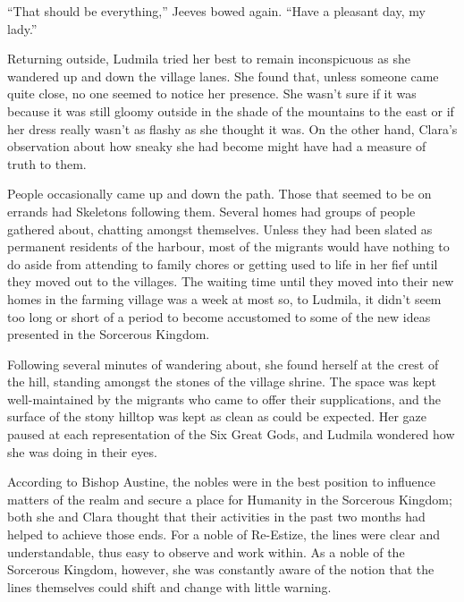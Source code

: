  

“That should be everything,” Jeeves bowed again. “Have a pleasant day, my lady.”

 

Returning outside, Ludmila tried her best to remain inconspicuous as she wandered up and down the village lanes. She found that, unless someone came quite close, no one seemed to notice her presence. She wasn’t sure if it was because it was still gloomy outside in the shade of the mountains to the east or if her dress really wasn’t as flashy as she thought it was. On the other hand, Clara’s observation about how sneaky she had become might have had a measure of truth to them.

 

People occasionally came up and down the path. Those that seemed to be on errands had Skeletons following them. Several homes had groups of people gathered about, chatting amongst themselves. Unless they had been slated as permanent residents of the harbour, most of the migrants would have nothing to do aside from attending to family chores or getting used to life in her fief until they moved out to the villages. The waiting time until they moved into their new homes in the farming village was a week at most so, to Ludmila, it didn’t seem too long or short of a period to become accustomed to some of the new ideas presented in the Sorcerous Kingdom.

 

Following several minutes of wandering about, she found herself at the crest of the hill, standing amongst the stones of the village shrine. The space was kept well-maintained by the migrants who came to offer their supplications, and the surface of the stony hilltop was kept as clean as could be expected. Her gaze paused at each representation of the Six Great Gods, and Ludmila wondered how she was doing in their eyes.

 

According to Bishop Austine, the nobles were in the best position to influence matters of the realm and secure a place for Humanity in the Sorcerous Kingdom; both she and Clara thought that their activities in the past two months had helped to achieve those ends. For a noble of Re-Estize, the lines were clear and understandable, thus easy to observe and work within. As a noble of the Sorcerous Kingdom, however, she was constantly aware of the notion that the lines themselves could shift and change with little warning.

 

